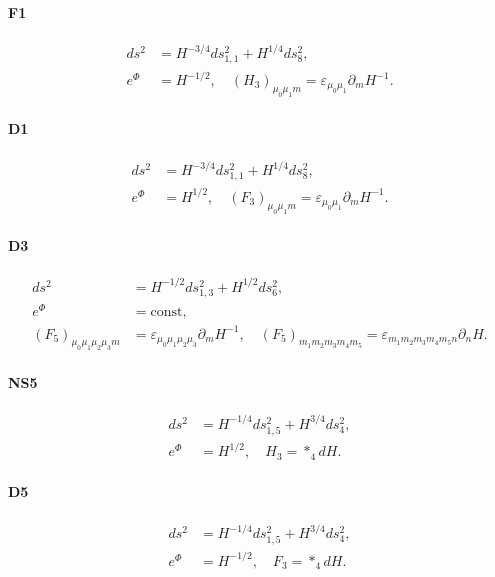 \paragraph{F1}
\begin{equation}
\begin{aligned}
ds^2
&= H^{-3/4}ds_{1,1}^2 + H^{1/4}ds_8^2,\\
e^{\Phi}
&= H^{-1/2},\quad
(H_3)_{\mu_0\mu_1 m} = \varepsilon_{\mu_0 \mu_1} \partial_m H^{-1}.
\end{aligned}
\end{equation}

\paragraph{D1}
\begin{equation}
\begin{aligned}
ds^2 
&= H^{-3/4}ds_{1,1}^2 + H^{1/4}ds_8^2,\\
e^{\Phi}
&= H^{1/2},\quad
(F_3)_{\mu_0\mu_1 m} = \varepsilon_{\mu_0 \mu_1} \partial_m H^{-1}.
\end{aligned}
\end{equation}


\paragraph{D3}

\begin{equation}
\begin{aligned}
ds^2 
&= H^{-1/2}ds_{1,3}^2 + H^{1/2}ds_6^2,\\
e^\Phi
&= \mathrm{const},\\
(F_5)_{\mu_0\mu_1\mu_2\mu_3 m} &= \varepsilon_{\mu_0\mu_1\mu_2\mu_3}\partial_m H^{-1},\quad
(F_5)_{m_1 m_2 m_3 m_4 m_5} = \varepsilon_{m_1m_2m_3m_4m_5 n}\partial_n H.
\end{aligned}
\end{equation}



\paragraph{NS5}
\begin{equation}
\begin{aligned}
ds^2 
&= H^{-1/4}ds_{1,5}^2 + H^{3/4}ds_4^2,\\
e^{\Phi}
&= H^{1/2},\quad H_3 = *_4 dH.
\end{aligned}
\end{equation}

\paragraph{D5}
\begin{equation}
\begin{aligned}
ds^2 
&= H^{-1/4}ds_{1,5}^2 + H^{3/4}ds_4^2,\\
e^{\Phi}
&= H^{-1/2},\quad F_3 = *_4 dH.
\end{aligned}
\end{equation}